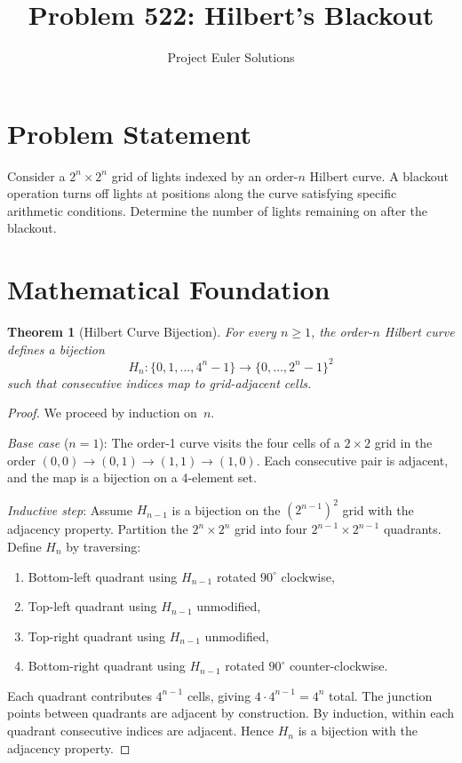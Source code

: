\documentclass[11pt]{article}
\title{Problem 522: Hilbert's Blackout}
\author{Project Euler Solutions}
\date{}
\newtheorem{theorem}{Theorem}
\begin{document}
\maketitle

\section{Problem Statement}
Consider a $2^n \times 2^n$ grid of lights indexed by an order-$n$ Hilbert curve. A blackout operation turns off lights at positions along the curve satisfying specific arithmetic conditions. Determine the number of lights remaining on after the blackout.

\section{Mathematical Foundation}

\begin{theorem}[Hilbert Curve Bijection]
For every $n \ge 1$, the order-$n$ Hilbert curve defines a bijection
\[
H_n : \{0, 1, \ldots, 4^n - 1\} \to \{0, \ldots, 2^n - 1\}^2
\]
such that consecutive indices map to grid-adjacent cells.
\end{theorem}

\begin{proof}
We proceed by induction on~$n$.

\emph{Base case} ($n = 1$): The order-1 curve visits the four cells of a $2 \times 2$ grid in the order $(0,0) \to (0,1) \to (1,1) \to (1,0)$. Each consecutive pair is adjacent, and the map is a bijection on a 4-element set.

\emph{Inductive step}: Assume $H_{n-1}$ is a bijection on the $(2^{n-1})^2$ grid with the adjacency property. Partition the $2^n \times 2^n$ grid into four $2^{n-1} \times 2^{n-1}$ quadrants. Define $H_n$ by traversing:
\begin{enumerate}
    \item Bottom-left quadrant using $H_{n-1}$ rotated $90^\circ$ clockwise,
    \item Top-left quadrant using $H_{n-1}$ unmodified,
    \item Top-right quadrant using $H_{n-1}$ unmodified,
    \item Bottom-right quadrant using $H_{n-1}$ rotated $90^\circ$ counter-clockwise.
\end{enumerate}
Each quadrant contributes $4^{n-1}$ cells, giving $4 \cdot 4^{n-1} = 4^n$ total. The junction points between quadrants are adjacent by construction. By induction, within each quadrant consecutive indices are adjacent. Hence $H_n$ is a bijection with the adjacency property.
\end{proof}
\end{document}
